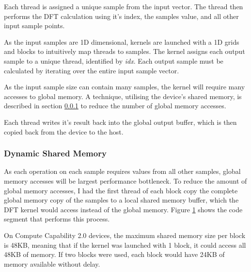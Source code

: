 \documentclass[11pt,a4paper]{article}
\begin{document}
Each thread is assigned a unique sample from the input vector. The thread then performs the DFT calculation using it's index, the samples value, and all other input sample points.

As the input samples are 1D dimensional, kernels are launched with a 1D grids and blocks to intuitively map threads to samples.
 The kernel assigns each output sample to a unique thread, identified by \textit{idx}. Each output sample must be calculated by iterating over the entire input sample vector. 

As the input sample size can contain many samples, the kernel will require many accesses to global memory. A technique, utilising the device's shared memory, is described in section \ref{sect:Dynamic Shared Memory} to reduce the number of global memory accesses.

Each thread writes it's result back into the global output buffer, which is then copied back from the device to the host.

\subsubsection{Dynamic Shared Memory} \label{sect:Dynamic Shared Memory}
As each operation on each sample requires values from all other samples, global memory accesses will be largest performance bottleneck. To reduce the amount of global memory accesses, I had the first thread of each block copy the complete global memory copy of the samples to a local shared memory buffer, which the DFT kernel would access instead of the global memory. Figure \ref{fig:code_cuda_all} shows the code segment that performs this process.

On Compute Capability 2.0 devices, the maximum shared memory size per block is 48KB, meaning that if the kernel was launched with 1 block, it could access all 48KB of memory. If two blocks were used, each block would have 24KB of memory available without delay.

\begin{figure}[H]%
    \centering
    \qquad
    \vspace{5pt}
    \caption{}
    \label{fig:code_cuda_all}%
\end{figure}
\end{document}

